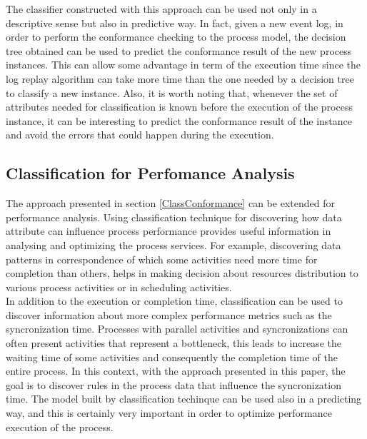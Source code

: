 \documentclass{llncs}
\begin{document}
The classifier constructed with this approach can be used not only in a descriptive sense but also in predictive way. In fact, given a new event log, in order to perform the conformance checking to the process model, the decision tree obtained can be used to predict the conformance result of the new process instances. This can allow some advantage in term of the execution time since the log replay algorithm can take more time than the one needed by a decision tree to classify a new instance. Also, it is worth noting that, whenever the set of attributes needed for classification is known before the execution of the process instance, it can be interesting to predict the conformance result of the instance and avoid the errors that could happen during the execution.




\subsection{Classification for Perfomance Analysis}\label{ClassPerf}

The approach presented in section \ref{ClassConformance} can be extended for performance analysis. Using classification technique for discovering how data attribute can influence process performance provides useful information in analysing and optimizing the process services. For example, discovering data patterns in correspondence of which some activities need more time for completion than others, helps in making decision about resources distribution to various process activities or in scheduling activities.\\

In addition to the execution or completion time, classification can be used to discover information about more complex performance metrics such as the syncronization time. Processes with parallel activities and syncronizations can often present activities that represent a bottleneck, this leads to increase the waiting time of some activities and consequently the completion time of the entire process. In this context, with the approach presented in this paper, the goal is to discover rules in the process data that influence the syncronization time. The model built by classification techinque can be used also in a predicting way, and this is certainly very important in order to optimize performance execution of the process.\\
\end{document}
